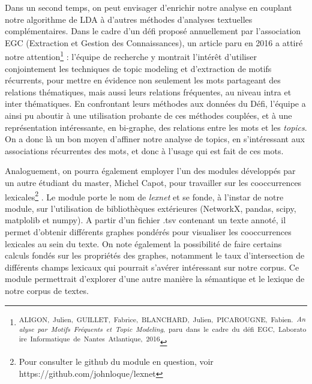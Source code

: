 \documentclass[letterpaper,portrait,12pt]{article}
\begin{document}
	Dans un second temps, on peut envisager d'enrichir notre analyse en couplant notre algorithme de LDA \`{a} d'autres m\'{e}thodes d'analyses textuelles compl\'{e}mentaires. Dans le cadre d'un d\'{e}fi propos\'{e} annuellement par l'association EGC (Extraction et Gestion des Connaissances), un article paru en 2016 a attir\'{e} notre attention\footnote{\textsuperscript{\newpage
}\textsuperscript{	}\textsuperscript{{\tiny ALIGON,\ Julien,\ GUILLET,\ Fabrice,\ BLANCHARD,\ Julien,\ PICAROUGNE,\ Fabien.\ }}\emph{\textsuperscript{{\tiny Analyse\ par\ Motifs\ Fr\'{e}quents\ et\ Topic\ Modeling}}}\textsuperscript{{\tiny ,\ paru\ dans\ le\ cadre\ du\ d\'{e}fi\ EGC,\ Laboratoire\ Informatique\ de\ Nantes\ Atlantique,\ 2016}}} : l'\'{e}quipe de recherche y montrait l'int\'{e}r\^{e}t d'utiliser conjointement les techniques de topic modeling et d'extraction de motifs r\'{e}currents, pour mettre en \'{e}vidence non seulement les mots partageant des relations th\'{e}matiques, mais aussi leurs relations fr\'{e}quentes, au niveau intra et inter th\'{e}matiques. En confrontant leurs m\'{e}thodes aux donn\'{e}es du D\'{e}fi, l'\'{e}quipe a ainsi pu aboutir \`{a} une utilisation probante de ces m\'{e}thodes coupl\'{e}es, et \`{a} une repr\'{e}sentation int\'{e}ressante, en bi-graphe, des relations entre les mots et les \emph{topics}. On a donc l\`{a} un bon moyen d'affiner notre analyse de topics, en s'int\'{e}ressant aux associations r\'{e}currentes des mots, et donc \`{a} l'usage qui est fait de ces mots. 





	Analoguement, on pourra \'{e}galement employer l'un des modules d\'{e}velopp\'{e}s par un autre \'{e}tudiant du master, Michel Capot, pour travailler sur les cooccurrences lexicales\footnote{	Pour consulter le github du module en question, voir https://github.com/johnloque/lexnet} . Le module porte le nom de \emph{lexnet} et se fonde, \`{a} l'instar de notre module, sur l'utilisation de biblioth\`{e}ques ext\'{e}rieures (NetworkX, pandas, scipy, matplolib et numpy). A partir d'un fichier .tsv contenant un texte annot\'{e}, il permet d'obtenir diff\'{e}rents graphes pond\'{e}r\'{e}s pour visualiser les cooccurrences lexicales au sein du texte. On note \'{e}galement la possibilit\'{e} de faire certains calculs fond\'{e}s sur les propri\'{e}t\'{e}s des graphes, notamment le taux d'intersection de diff\'{e}rents champs lexicaux qui pourrait s'av\'{e}rer int\'{e}ressant sur notre corpus. Ce module permettrait d'explorer d'une autre mani\`{e}re la s\'{e}mantique et le lexique de notre corpus de textes. 
\end{document}
